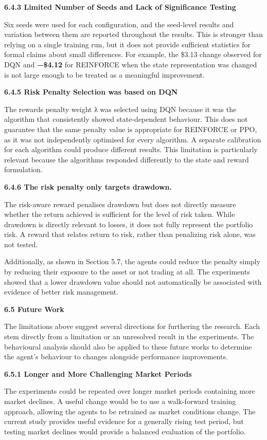 \textbf{6.4.3 Limited Number of Seeds and Lack of Significance Testing}

Six seeds were used for each configuration, and the seed-level results
and variation between them are reported throughout the results. This is
stronger than relying on a single training run, but it does not provide
sufficient statistics for formal claims about small differences. For
example, the \$3.13 change observed for DQN and \textbf{−\$4.12} for
REINFORCE when the state representation was changed is not large enough
to be treated as a meaningful improvement.

\textbf{6.4.5 Risk Penalty Selection was based on DQN}

The reward\textquotesingle s penalty weight λ was selected using DQN
because it was the algorithm that consistently showed state-dependent
behaviour. This does not guarantee that the same penalty value is
appropriate for REINFORCE or PPO, as it was not independently optimised
for every algorithm. A separate calibration for each algorithm could
produce different results. This limitation is particularly relevant
because the algorithms responded differently to the state and reward
formulation.

\textbf{6.4.6 The risk penalty only targets drawdown.}

The risk-aware reward penalises drawdown but does not directly measure
whether the return achieved is sufficient for the level of risk taken.
While drawdown is directly relevant to losses, it does not fully
represent the portfolio risk. A reward that relates return to risk,
rather than penalizing risk alone, was not tested.

Additionally, as shown in Section 5.7, the agents could reduce the
penalty simply by reducing their exposure to the asset or not trading at
all. The experiments showed that a lower drawdown value should not
automatically be associated with evidence of better risk management.

\textbf{6.5 Future Work}

The limitations above suggest several directions for furthering the
research. Each stem directly from a limitation or an unresolved result
in the experiments. The behavioural analysis should also be applied to
these future works to determine the agent's behaviour to changes
alongside performance improvements.

\textbf{6.5.1 Longer and More Challenging Market Periods}

The experiments could be repeated over longer market periods containing
more market declines. A useful change would be to use a walk-forward
training approach, allowing the agents to be retrained as market
conditions change. The current study provides useful evidence for a
generally rising test period, but testing market declines would provide
a balanced evaluation of the portfolio.

